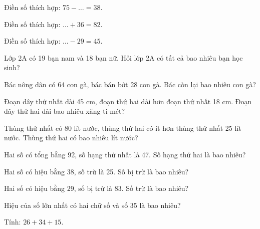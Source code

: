 \begin{ex}
Điền số thích hợp: $75 - \dots = 38$.
\end{ex}

\begin{ex}
Điền số thích hợp: $\dots + 36 = 82$.
\end{ex}

\begin{ex}
Điền số thích hợp: $\dots - 29 = 45$.
\end{ex}

\begin{ex}
Lớp 2A có 19 bạn nam và 18 bạn nữ. Hỏi lớp 2A có tất cả bao nhiêu bạn học sinh?
\end{ex}

\begin{ex}
Bác nông dân có 64 con gà, bác bán bớt 28 con gà. Bác còn lại bao nhiêu con gà?
\end{ex}

\begin{ex}
Đoạn dây thứ nhất dài 45 cm, đoạn thứ hai dài hơn đoạn thứ nhất 18 cm. Đoạn dây thứ hai dài bao nhiêu xăng-ti-mét?
\end{ex}

\begin{ex}
Thùng thứ nhất có 80 lít nước, thùng thứ hai có ít hơn thùng thứ nhất 25 lít nước. Thùng thứ hai có bao nhiêu lít nước?
\end{ex}

\begin{ex}
Hai số có tổng bằng 92, số hạng thứ nhất là 47. Số hạng thứ hai là bao nhiêu?
\end{ex}

\begin{ex}
Hai số có hiệu bằng 38, số trừ là 25. Số bị trừ là bao nhiêu?
\end{ex}

\begin{ex}
Hai số có hiệu bằng 29, số bị trừ là 83. Số trừ là bao nhiêu?
\end{ex}

\begin{ex}
Hiệu của số lớn nhất có hai chữ số và số 35 là bao nhiêu?
\end{ex}

\begin{ex}
Tính: $26 + 34 + 15$.
\end{ex}
